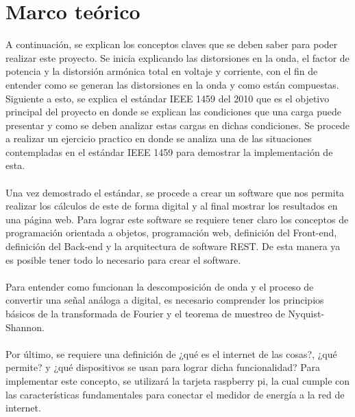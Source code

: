 \newpage{\clearpage}
\chapter{ Marco te\'{o}rico}

A continuación, se explican los conceptos claves que se deben saber para poder realizar este proyecto. Se inicia explicando las distorsiones en la onda, el factor de potencia y la distorsión armónica total en voltaje y corriente, con el fin de entender como se generan las distorsiones en la onda y como están compuestas. Siguiente a esto, se explica el estándar IEEE 1459 del 2010 que es el objetivo principal del proyecto en donde se explican las condiciones que una carga puede presentar y como se deben analizar estas cargas en dichas condiciones. Se procede a realizar un ejercicio practico en donde se analiza una de las situaciones contempladas en el estándar IEEE 1459 para demostrar la implementación de esta.\\\\
Una vez demostrado el estándar, se procede a crear un software que nos permita realizar los cálculos de este de forma digital y al final mostrar los resultados en una página web. Para lograr este software se requiere tener claro los conceptos de programación orientada a objetos, programación web, definición del Front-end, definición del Back-end y la arquitectura de software REST. De esta manera ya es posible tener todo lo necesario para crear el software.\\\\
Para entender como funcionan la descomposición de onda y el proceso de convertir una señal análoga a digital, es necesario comprender los principios básicos de la transformada de Fourier y el teorema de muestreo de Nyquist-Shannon.\\\\
Por último, se requiere una definición de ¿qué es el internet de las cosas?, ¿qué permite? y ¿qué dispositivos se usan para lograr dicha funcionalidad? Para implementar este concepto, se utilizará la tarjeta raspberry pi, la cual cumple con las características fundamentales para conectar el medidor de energía a la red de internet.\\\\

